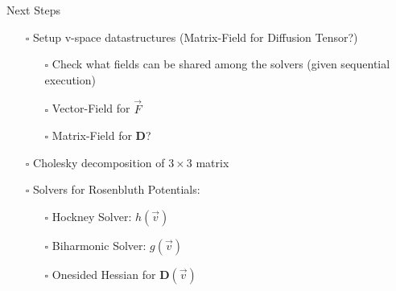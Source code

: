 \begin{frame}{Next Steps}
    \begin{itemize}
        \item[$\square$] Setup v-space datastructures (Matrix-Field for Diffusion Tensor?)
        \begin{itemize}
            \item[$\square$] Check what fields can be shared among the solvers (given sequential execution)
            \item[$\square$] Vector-Field for $\vec{F}$
            \item[$\square$] Matrix-Field for $\bm D$?
        \end{itemize}
        \item[$\square$] Cholesky decomposition of $3\times3$ matrix
        \item[$\square$] Solvers for Rosenbluth Potentials:
        \begin{itemize}
            \item[$\square$] Hockney Solver: $h(\vec v)$
            \item[$\square$] Biharmonic Solver: $g(\vec v)$
            \item[$\square$] Onesided Hessian for $\bm D(\vec v)$
        \end{itemize}
    \end{itemize}
\end{frame}




